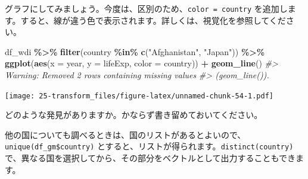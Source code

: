 \documentclass[
  xelatex, ja=standard]{bxjsbook}
\newenvironment{Shaded}{\begin{snugshade}}{\end{snugshade}}
\newcommand{\AttributeTok}[1]{\textcolor[rgb]{0.13,0.29,0.53}{#1}}
\newcommand{\CommentTok}[1]{\textcolor[rgb]{0.56,0.35,0.01}{\textit{#1}}}
\newcommand{\FunctionTok}[1]{\textcolor[rgb]{0.13,0.29,0.53}{\textbf{#1}}}
\newcommand{\NormalTok}[1]{#1}
\newcommand{\SpecialCharTok}[1]{\textcolor[rgb]{0.81,0.36,0.00}{\textbf{#1}}}
\newcommand{\StringTok}[1]{\textcolor[rgb]{0.31,0.60,0.02}{#1}}
\theoremstyle{definition}
\theoremstyle{definition}
\theoremstyle{definition}
\theoremstyle{definition}
\theoremstyle{remark}
\begin{document}
グラフにしてみましょう。今度は、区別のため、\texttt{color\ =\ country} を追加します。すると、線が違う色で表示されます。詳しくは、視覚化を参照してください。

\begin{Shaded}
\begin{Highlighting}[]
\NormalTok{df\_wdi }\SpecialCharTok{\%\textgreater{}\%} \FunctionTok{filter}\NormalTok{(country }\SpecialCharTok{\%in\%} \FunctionTok{c}\NormalTok{(}\StringTok{"Afghanistan"}\NormalTok{, }\StringTok{"Japan"}\NormalTok{)) }\SpecialCharTok{\%\textgreater{}\%}
  \FunctionTok{ggplot}\NormalTok{(}\FunctionTok{aes}\NormalTok{(}\AttributeTok{x =}\NormalTok{ year, }\AttributeTok{y =}\NormalTok{ lifeExp, }\AttributeTok{color =}\NormalTok{ country)) }\SpecialCharTok{+} \FunctionTok{geom\_line}\NormalTok{()}
\CommentTok{\#\textgreater{} Warning: Removed 2 rows containing missing values}
\CommentTok{\#\textgreater{} (\textasciigrave{}geom\_line()\textasciigrave{}).}
\end{Highlighting}
\end{Shaded}

\texttt{[image: 25-transform\_files/figure-latex/unnamed-chunk-54-1.pdf]}

どのような発見がありますか。かならず書き留めておいてください。

他の国についても調べるときは、国のリストがあるとよいので、 \texttt{unique(df\_gm\$country)} とすると、リストが得られます。\texttt{distinct(country)} で、異なる国を選択してから、その部分をベクトルとして出力することもできます。
\end{document}
